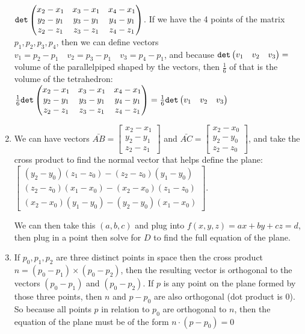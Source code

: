 \documentclass{article}
\begin{document}
\begin{enumerate}
	$\verb+det+\begin{pmatrix} x_2-x_1 & x_3-x_1 & x_4-x_1 \\ y_2-y_1 & y_3-y_1 & y_4-y_1 \\ z_2-z_1 & z_3-z_1 & z_4-z_1  \end{pmatrix}$. If we have the 4 points of the matrix $p_1,p_2,p_3,p_4$, then we can define vectors $v_1=p_2-p_1 \quad v_2=p_3-p_1 \quad v_3=p_4-p_1$, and because $\verb+det+\begin{pmatrix} v_1 & v_2 & v_3 \end{pmatrix} =$ volume of the parallelpiped shaped by the vectors, then $\frac{1}{6} $ of that is the volume of the tetrahedron: $\frac{1}{6} \verb+det+\begin{pmatrix} x_2-x_1 & x_3-x_1 & x_4-x_1 \\ y_2-y_1 & y_3-y_1 & y_4-y_1 \\ z_2-z_1 & z_3-z_1 & z_4-z_1  \end{pmatrix}=\frac{1}{6} \verb+det+\begin{pmatrix} v_1 & v_2 & v_3 \end{pmatrix}$
	
	\item We can have vectors $\bar{AB}=\begin{bmatrix} x_2-x_1\\y_2-y_1\\z_2-z_1 \end{bmatrix} $ and $\bar{AC}=\begin{bmatrix} x_2-x_0\\y_2-y_0\\z_2-z_0 \end{bmatrix} $, and take the cross product to find the normal vector that helps define the plane: $\begin{bmatrix} (y_2-y_0)(z_1-z_0)-(z_2-z_0)(y_1-y_0) \\ (z_2-z_0)(x_1-x_0)-(x_2-x_0)(z_1-z_0) \\ (x_2-x_0)(y_1-y_0)-(y_2-y_0)(x_1-x_0) \end{bmatrix} $.
	
	We can then take this $(a,b,c)$ and plug into $f(x,y,z)=ax+by+cz=d$, then plug in a point then solve for $D$ to find the full equation of the plane.
	
	\item If $p_0,p_1,p_2$ are three distinct points in space then the cross product $n=(p_0-p_1)\times(p_0-p_2)$, then the resulting vector is orthogonal to the vectors $(p_0-p_1)$ and $(p_0-p_2)$. If $p$ is any point on the plane formed by those three points, then $n$ and $p-p_0$ are also orthogonal (dot product is 0). So because all points $p$ in relation to $p_0$ are orthogonal to $n$, then the equation of the plane must be of the form $n\cdot(p-p_0)=0$
	

\end{enumerate}
\end{document}
